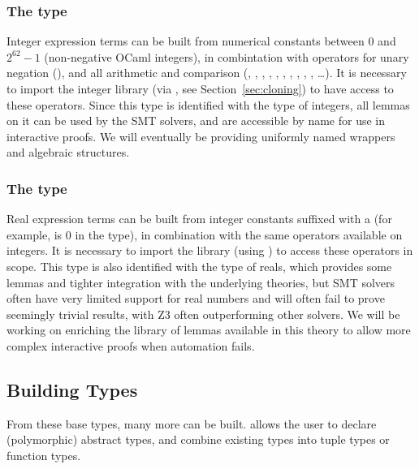 \subsubsection*{The  type}
Integer expression terms can be built from numerical constants between $0$ and
$2^{62} - 1$ (non-negative OCaml integers), in combintation with operators for
unary negation (\rawec{-}), and all arithmetic and comparison (\rawec{+},
\rawec{-}, \rawec{*}, \rawec{/}, \rawec{\%}, \rawec{^}, \rawec{=}, \rawec{<},
\rawec{<=}, \rawec{>}, \rawec{>=} \ldots). It is necessary to import the integer
library (via , see Section~\ref{sec:cloning}) to have
access to these operators. Since this type is identified with the \WhyThree type
of integers, all \WhyThree lemmas on it can be used by the SMT solvers, and are
accessible by name for use in interactive proofs. We will eventually be
providing uniformly named wrappers and algebraic structures.

\subsubsection*{The  type}
Real expression terms can be built from integer constants suffixed with a
 (for example,  is 0 in the  type), in
combination with the same operators available on integers. It is necessary to
import the library (using ) to access these
operators in scope. This type is also identified with the \WhyThree type of
reals, which provides some lemmas and tighter integration with the underlying
theories, but SMT solvers often have very limited support for real numbers and
will often fail to prove seemingly trivial results, with Z3 often outperforming
other solvers. We will be working on enriching the library of lemmas available
in this theory to allow more complex interactive proofs when automation fails.


\subsection{Building Types}
From these base types, many more can be built. \EasyCrypt allows the user to declare
 (polymorphic) abstract types, and combine existing types into tuple types or
function types.



